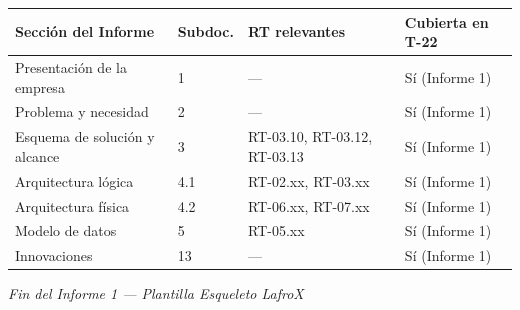 \documentclass[11pt,a4paper,oneside]{report}
\begin{document}
\begin{tabularx}{\textwidth}{|L{3.5cm}|C{1.5cm}|L{5cm}|X|}
\hline
{}
\textbf{Sección del Informe} & \textbf{Subdoc.} & \textbf{RT relevantes} & \textbf{Cubierta en T-22} \\
\hline
Presentación de la empresa & 1 & --- & Sí (Informe 1) \\
\hline
Problema y necesidad & 2 & --- & Sí (Informe 1) \\
\hline
Esquema de solución y alcance & 3 & RT-03.10, RT-03.12, RT-03.13 & Sí (Informe 1) \\
\hline
Arquitectura lógica & 4.1 & RT-02.xx, RT-03.xx & Sí (Informe 1) \\
\hline
Arquitectura física & 4.2 & RT-06.xx, RT-07.xx & Sí (Informe 1) \\
\hline
Modelo de datos & 5 & RT-05.xx & Sí (Informe 1) \\
\hline
Innovaciones & 13 & --- & Sí (Informe 1) \\
\hline
\end{tabularx}

\vfill
\begin{center}
\small\color{lafroxGrato}\textit{Fin del Informe 1 --- Plantilla Esqueleto LafroX}
\end{center}
\end{document}
